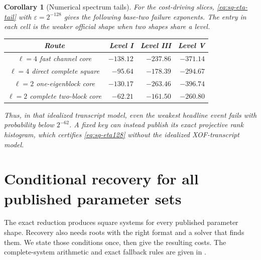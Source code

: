\documentclass[11pt]{article}
\newtheorem{corollary}[theorem]{Corollary}
\begin{document}
\begin{corollary}[Numerical spectrum tails]
\label{cor:sq-spectrum-tails}
For the cost-driving slices, \eqref{eq:sq-eta-tail} with
$\varepsilon=2^{-128}$ gives the following base-two failure exponents.  The
entry in each cell is the weaker official shape when two shapes share a
level.
\begin{center}
\small
\begin{tabular}{@{}c r r r@{}}
\toprule
Route & Level I & Level III & Level V\\
\midrule
$\ell=4$ fast channel core & $-138.12$ & $-237.86$ & $-371.14$\\
$\ell=4$ direct complete square & $-95.64$ & $-178.39$ & $-294.67$\\
$\ell=2$ one-eigenblock core & $-130.17$ & $-263.46$ & $-396.74$\\
$\ell=2$ complete two-block core & $-62.21$ & $-161.50$ & $-260.80$\\
\bottomrule
\end{tabular}
\end{center}
Thus, in that idealized transcript model, even the weakest headline event
fails with probability below $2^{-62}$.
A fixed key can instead publish its exact projective rank histogram, which
certifies \eqref{eq:sq-eta128} without the idealized XOF-transcript model.
\end{corollary}

\section{Conditional recovery for all published parameter sets}
\label{sec:sq-overview}

The exact reduction produces square systems for every published parameter
shape.  Recovery also needs roots with the right format and a solver that
finds them.  We state those conditions once, then give the resulting costs.
The complete-system arithmetic and exact fallback rules are given in
.
\end{document}
